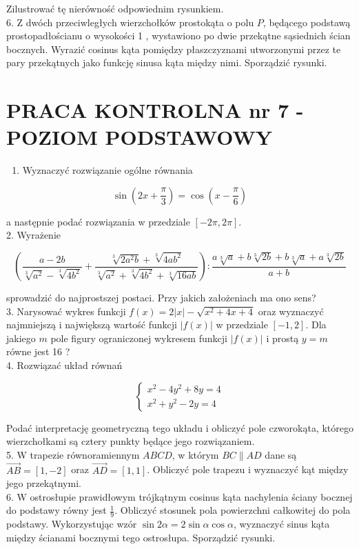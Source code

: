 \documentclass[10pt]{article}
\begin{document}
Zilustrować tę nierówność odpowiednim rysunkiem.\\
6. Z dwóch przeciwległych wierzchołków prostokąta o polu $P$, będącego podstawą prostopadłościanu o wysokości 1 , wystawiono po dwie przekątne sąsiednich ścian bocznych. Wyrazić cosinus kąta pomiędzy płaszczyznami utworzonymi przez te pary przekątnych jako funkcję sinusa kąta między nimi. Sporządzić rysunki.

\section*{PRACA KONTROLNA nr 7 - POZIOM PODSTAWOWY}
\begin{enumerate}
  \item Wyznaczyć rozwiązanie ogólne równania
\end{enumerate}

$$
\sin \left(2 x+\frac{\pi}{3}\right)=\cos \left(x-\frac{\pi}{6}\right)
$$

a następnie podać rozwiązania w przedziale $[-2 \pi, 2 \pi]$.\\
2. Wyrażenie

$$
\left(\frac{a-2 b}{\sqrt[3]{a^{2}}-\sqrt[3]{4 b^{2}}}+\frac{\sqrt[3]{2 a^{2} b}+\sqrt[3]{4 a b^{2}}}{\sqrt[3]{a^{2}}+\sqrt[3]{4 b^{2}}+\sqrt[3]{16 a b}}\right): \frac{a \sqrt[3]{a}+b \sqrt[3]{2 b}+b \sqrt[3]{a}+a \sqrt[3]{2 b}}{a+b}
$$

sprowadzić do najprostszej postaci. Przy jakich założeniach ma ono sens?\\
3. Narysować wykres funkcji $f(x)=2|x|-\sqrt{x^{2}+4 x+4}$ oraz wyznaczyć najmniejszą i największą wartość funkcji $|f(x)|$ w przedziale $[-1,2]$. Dla jakiego $m$ pole figury ograniczonej wykresem funkcji $|f(x)|$ i prostą $y=m$ równe jest 16 ?\\
4. Rozwiązać układ równań

$$
\left\{\begin{array}{l}
x^{2}-4 y^{2}+8 y=4 \\
x^{2}+y^{2}-2 y=4
\end{array}\right.
$$

Podać interpretację geometryczną tego układu i obliczyć pole czworokąta, którego wierzchołkami są cztery punkty będące jego rozwiązaniem.\\
5. W trapezie równoramiennym $A B C D$, w którym $B C \| A D$ dane są $\overrightarrow{A B}=[1,-2]$ oraz $\overrightarrow{A D}=[1,1]$. Obliczyć pole trapezu i wyznaczyć kąt między jego przekątnymi.\\
6. W ostrosłupie prawidłowym trójkątnym cosinus kąta nachylenia ściany bocznej do podstawy równy jest $\frac{1}{9}$. Obliczyć stosunek pola powierzchni całkowitej do pola podstawy. Wykorzystując wzór $\sin 2 \alpha=2 \sin \alpha \cos \alpha$, wyznaczyć sinus kąta między ścianami bocznymi tego ostrosłupa. Sporządzić rysunki.
\end{document}
